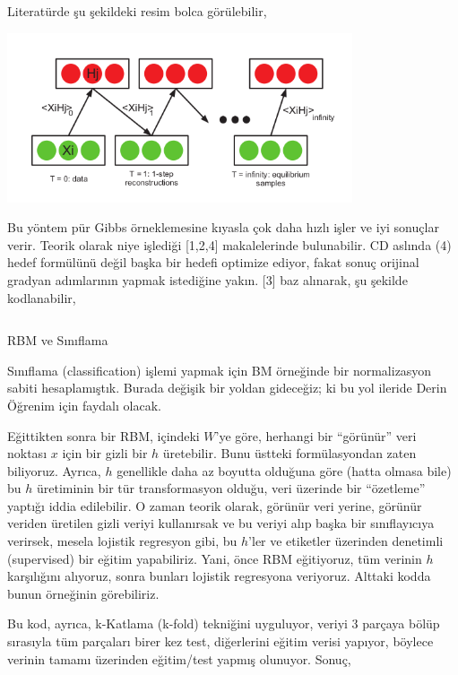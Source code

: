 \documentclass[12pt,fleqn]{article}\usepackage{../../common}
\begin{document}
Literatürde şu şekildeki resim bolca görülebilir,

\includegraphics[height=5cm]{rbm_03.png}

Bu yöntem pür Gibbs örneklemesine kıyasla çok daha hızlı işler ve iyi
sonuçlar verir. Teorik olarak niye işlediği [1,2,4] makalelerinde
bulunabilir. CD aslında (4) hedef formülünü değil başka bir hedefi optimize
ediyor, fakat sonuç orijinal gradyan adımlarının yapmak istediğine
yakın. [3] baz alınarak, şu şekilde kodlanabilir,

\inputminted[fontsize=\footnotesize]{python}{rbm.py}

RBM ve Sınıflama 

Sınıflama (classification) işlemi yapmak için BM örneğinde bir
normalizasyon sabiti hesaplamıştık. Burada değişik bir yoldan gideceğiz; ki
bu yol ileride Derin Öğrenim için faydalı olacak. 

Eğittikten sonra bir RBM, içindeki $W$'ye göre, herhangi bir ``görünür''
veri noktası $x$ için bir gizli bir $h$ üretebilir. Bunu üstteki
formülasyondan zaten biliyoruz. Ayrıca, $h$ genellikle daha az boyutta
olduğuna göre (hatta olmasa bile) bu $h$ üretiminin bir tür transformasyon
olduğu, veri üzerinde bir ``özetleme'' yaptığı iddia edilebilir. O zaman
teorik olarak, görünür veri yerine, görünür veriden üretilen gizli veriyi
kullanırsak ve bu veriyi alıp başka bir sınıflayıcıya verirsek, mesela
lojistik regresyon gibi, bu $h$'ler ve etiketler üzerinden denetimli
(supervised) bir eğitim yapabiliriz. Yani, önce RBM eğitiyoruz, tüm verinin
$h$ karşılığını alıyoruz, sonra bunları lojistik regresyona
veriyoruz. Alttaki kodda bunun örneğinin görebiliriz.

Bu kod, ayrıca, k-Katlama (k-fold) tekniğini uyguluyor, veriyi 3 parçaya
bölüp sırasıyla tüm parçaları birer kez test, diğerlerini eğitim verisi
yapıyor, böylece verinin tamamı üzerinden eğitim/test yapmış
olunuyor. Sonuç,

\inputminted[fontsize=\footnotesize]{python}{test_rbmkfold.py}
\end{document}
